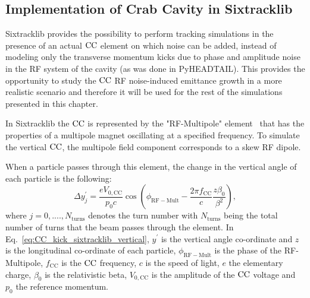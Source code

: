 

\subsection{Implementation of Crab Cavity in Sixtracklib}\label{subsec:sixtracklig_CC_implementation}
Sixtracklib provides the possibility to perform tracking simulations in the presence of an actual ${\mathrm{CC}}$ element on which noise can be added, instead of modeling only the transverse momentum kicks due to phase and amplitude noise in the RF system of the cavity (as was done in PyHEADTAIL). This provides the opportunity to study the ${\mathrm{CC}}$ RF noise-induced emittance growth in a more realistic scenario and therefore it will be used for the rest of the simulations presented in this chapter.

In Sixtracklib the ${\mathrm{CC}}$ is represented by the "RF-Multipole" element~\cite{sixtracklib_repo} that has the properties of a multipole magnet oscillating at a specified frequency. To simulate the vertical ${\mathrm{CC}}$, the multipole field component corresponds to a skew RF dipole.


When a particle passes through this element, the change in the vertical angle of each particle is the following:
\begin{equation}\label{eq:CC_kick_sixtracklib_vertical}
    \Delta y^\prime_{j} =  \frac{e V_\mathrm{0,CC}}{p_0 c} \cos{\left ( \phi_\mathrm{RF-Mult} - \frac{2\pi f_\mathrm{CC}}{c} \frac{z \beta_0}{\beta^2} \right )},
\end{equation}
where $j={0, ...., N_\mathrm{turns}}$ denotes the turn number with $N_\mathrm{turns}$ being the total number of turns that the beam passes through the element. In Eq.~\eqref{eq:CC_kick_sixtracklib_vertical}, $y^\prime$ is the vertical angle co-ordinate and $z$ is the longitudinal co-ordinate of each particle, $\phi_\mathrm{RF-Mult}$ is the phase of the RF-Multipole, $f_\mathrm{CC}$ is the ${\mathrm{CC}}$ frequency, $c$ is the speed of light, $e$ the elementary charge, $\beta_0$ is the relativistic beta, $V_\mathrm{0,CC}$ is the amplitude of the ${\mathrm{CC}}$ voltage and $p_0$ the reference momentum.

